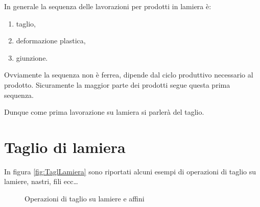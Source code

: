In generale la sequenza delle lavorazioni per prodotti in lamiera è:
\begin{enumerate}
\item taglio,
\item deformazione plastica,
\item giunzione.
\end{enumerate}
Ovviamente la sequenza non è ferrea, dipende dal ciclo produttivo necessario al prodotto. Sicuramente la maggior parte dei prodotti segue questa prima sequenza.

Dunque come prima lavorazione su lamiera si parlerà del taglio.

\section{Taglio di lamiera}
In figura \ref{fig:TaglLamiera} sono riportati alcuni esempi di operazioni di taglio su lamiere, nastri, fili ecc\dots

\begin{figure}
\centering
{}\quad
{}
\caption{Operazioni di taglio su lamiere e affini}
\label{fig:TaglLam}
\end{figure}
